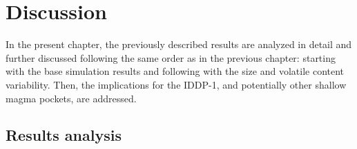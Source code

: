 \chapter{Discussion}
In the present chapter, the previously described results are analyzed in detail and further discussed following the same order as in the previous chapter: starting with the base simulation results and following with the size and volatile content variability. Then, the implications for the IDDP-1, and potentially other shallow magma pockets, are addressed.

\section{Results analysis}
